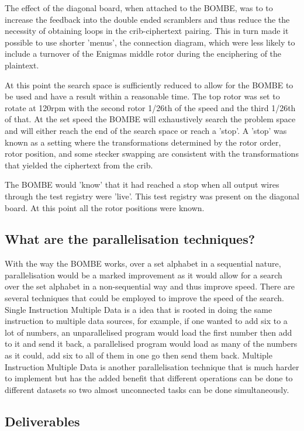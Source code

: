 \documentclass[12pt,a4paper]{article}
\begin{document}
The effect of the diagonal board, when attached to the BOMBE, was to to increase the feedback into the double ended scramblers and thus reduce the the necessity of obtaining loops in the crib-ciphertext pairing. This in turn made it possible to use shorter 'menus', the connection diagram, which were less likely to include a turnover of the Enigmas middle rotor during the enciphering of the plaintext.

At this point the search space is sufficiently reduced to allow for the BOMBE to be used and have a result within a reasonable time. The top rotor was set to rotate at 120rpm with the second rotor 1/26th of the speed and the third 1/26th of that. At the set speed the BOMBE will exhaustively search the problem space and will either reach the end of the search space or reach a 'stop'. A 'stop' was known as a setting where the transformations determined by the rotor order, rotor position, and some stecker swapping are consistent with the transformations that yielded the ciphertext from the crib. 

The BOMBE would 'know' that it had reached a stop when all output wires through the test registry were 'live'. This test registry was present on the diagonal board. At this point all the rotor positions were known.

\subsection{What are the parallelisation techniques?}

With the way the BOMBE works, over a set alphabet in a sequential nature, parallelisation would be a marked improvement as it would allow for a search over the set alphabet in a non-sequential way and thus improve speed. There are several techniques that could be employed to improve the speed of the search. Single Instruction Multiple Data is a idea that is rooted in doing the same instruction to multiple data sources, for example, if one wanted to add six to a lot of numbers, an unparallelised program would load the first number then add to it and send it back, a parallelised program would load as many of the numbers as it could, add six to all of them in one go then send them back. Multiple Instruction Multiple Data is another parallelisation technique that is much harder to implement but has the added benefit that different operations can be done to different datasets so two almost unconnected tasks can be done simultaneously. 

\subsection{Deliverables}
\end{document}
